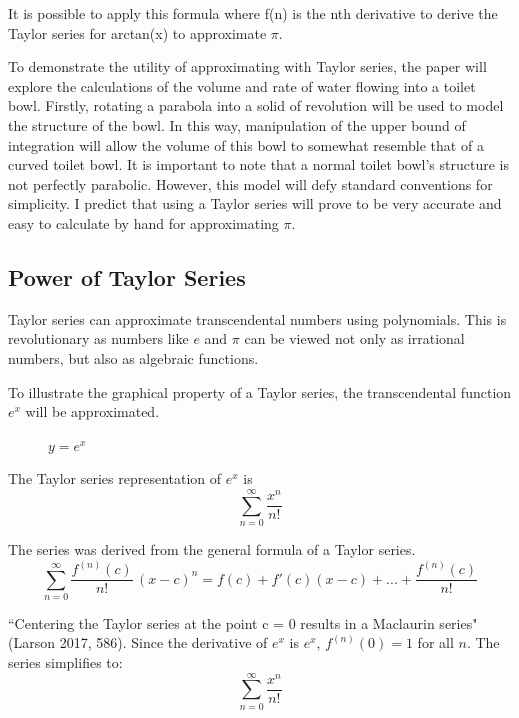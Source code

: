 \documentclass[12pt, titlepage]{article}
\begin{document}
It is possible to apply this formula where f(n) is the nth derivative to derive the Taylor series for arctan(x) to approximate \(\pi\).

To demonstrate the utility of approximating with Taylor series, the paper will explore the calculations of the volume and rate of water flowing into a toilet bowl. Firstly, rotating a parabola into a solid of revolution will be used to model the structure of the bowl. In this way, manipulation of the upper bound of integration will allow the volume of this bowl to somewhat resemble that of a curved toilet bowl. It is important to note that a normal toilet bowl's structure is not perfectly parabolic. However, this model will defy standard conventions for simplicity. I predict that using a Taylor series will prove to be very accurate and easy to calculate by hand for approximating \(\pi\). 

\subsection{Power of Taylor Series}
Taylor series can approximate transcendental numbers using polynomials. This is revolutionary as numbers like \(e\) and \(\pi\) can be viewed not only as irrational numbers, but also as algebraic functions.

To illustrate the graphical property of a Taylor series, the transcendental function \(e^{x}\) will be approximated.
\begin{figure}[H]
\centering
    \caption[]{\(y=e^x\)}
\end{figure}

The Taylor series representation of \(e^{x}\) is  
\begin{equation*}
  \sum_{n=0}^{\infty} \frac{x^{n}}{n!}
\end{equation*}

The series was derived from the general formula of a Taylor series.
\begin{equation*}
  \sum_{n=0}^{\infty} \frac{f^{(n)}(c)}{n!} \, (x-c)^{n} = f(c) + f'(c)(x-c) + ... +  \frac{f^{(n)}(c)}{n!}
\end{equation*}

``Centering the Taylor series at the point c = 0 results in a Maclaurin series" (Larson 2017, 586). Since the derivative of \(e^{x}\) is \(e^{x}\), \(f^{(n)}(0) = 1\) for all \(n\). The series simplifies to:
\begin{equation*}
  \sum_{n=0}^{\infty} \frac{x^{n}}{n!}
\end{equation*}
\end{document}
